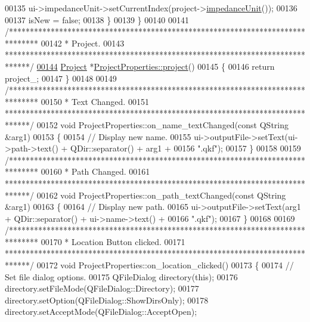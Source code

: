 \begin{DoxyCode}
00135     ui->impedanceUnit->setCurrentIndex(project->\hyperlink{class_project_ad0725b9aa4445dd6d21d4e15df482d3b}{impedanceUnit}());
00136 
00137     isNew = \textcolor{keyword}{false};
00138   \}
00139 \}
00140 
00141 \textcolor{comment}{/*******************************************************************************}
00142 \textcolor{comment}{ * Project.}
00143 \textcolor{comment}{ ******************************************************************************/}
\hypertarget{projectproperties_8cpp_source_l00144}{}\hyperlink{group___window_ga241ef3f82071d6091e4addbda53a634c}{00144} \hyperlink{class_project}{Project} *\hyperlink{group___window_ga241ef3f82071d6091e4addbda53a634c}{ProjectProperties::project}()
00145 \{
00146   \textcolor{keywordflow}{return} project\_;
00147 \}
00148 
00149 \textcolor{comment}{/*******************************************************************************}
00150 \textcolor{comment}{ * Text Changed.}
00151 \textcolor{comment}{ ******************************************************************************/}
00152 \textcolor{keywordtype}{void} ProjectProperties::on\_name\_textChanged(\textcolor{keyword}{const} QString &arg1)
00153 \{
00154   \textcolor{comment}{// Display new name.}
00155   ui->outputFile->setText(ui->path->text() + QDir::separator() + arg1 +
00156                           \textcolor{stringliteral}{".qkf"});
00157 \}
00158 
00159 \textcolor{comment}{/*******************************************************************************}
00160 \textcolor{comment}{ * Path Changed.}
00161 \textcolor{comment}{ ******************************************************************************/}
00162 \textcolor{keywordtype}{void} ProjectProperties::on\_path\_textChanged(\textcolor{keyword}{const} QString &arg1)
00163 \{
00164   \textcolor{comment}{// Display new path.}
00165   ui->outputFile->setText(arg1 + QDir::separator() + ui->name->text() +
00166                           \textcolor{stringliteral}{".qkf"});
00167 \}
00168 
00169 \textcolor{comment}{/*******************************************************************************}
00170 \textcolor{comment}{ * Location Button clicked.}
00171 \textcolor{comment}{ ******************************************************************************/}
00172 \textcolor{keywordtype}{void} ProjectProperties::on\_location\_clicked()
00173 \{
00174   \textcolor{comment}{// Set file dialog options.}
00175   QFileDialog directory(\textcolor{keyword}{this});
00176   directory.setFileMode(QFileDialog::Directory);
00177   directory.setOption(QFileDialog::ShowDirsOnly);
00178   directory.setAcceptMode(QFileDialog::AcceptOpen);

\end{DoxyCode}
